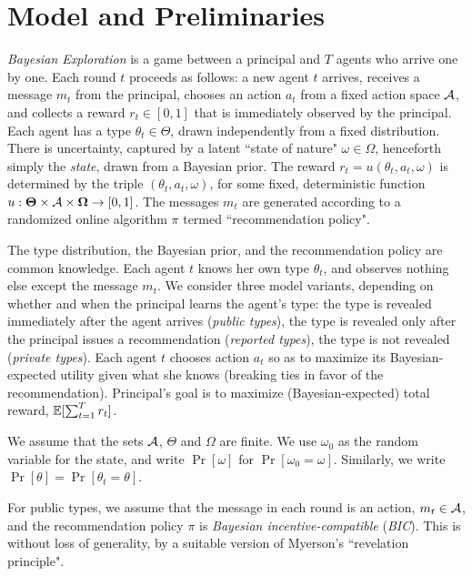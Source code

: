 \section{Model and Preliminaries}
\label{sec:model}

\emph{Bayesian Exploration} is a game between a principal and $T$ agents who arrive one by one. Each round $t$ proceeds as follows: a new agent $t$ arrives, receives a message $m_t$ from the principal, chooses an action $a_t$ from a fixed action space $\mathcal{A}$, and collects a reward $r_t\in [0,1]$ that is immediately observed by the principal. Each agent has a type $\theta_t\in\varTheta$, drawn independently from a fixed distribution. There is uncertainty, captured by a latent ``state of nature" $\omega\in \varOmega$, henceforth simply the \emph{state}, drawn from a Bayesian prior. The reward $r_t = u(\theta_t,a_t,\omega)$ is determined by the triple $(\theta_t,a_t,\omega)$, for some fixed, deterministic function
    $u:\bold{\Theta}\times \mathcal{A} \times \bold{\Omega} \to [0,1]$.
The messages $m_t$ are generated according to a randomized online algorithm $\pi$ termed ``recommendation policy".

The type distribution, the Bayesian prior, and the recommendation policy are common knowledge. Each agent $t$ knows her own type $\theta_t$, and observes nothing else except the message $m_t$.  We consider three model variants, depending on whether and when the principal learns the agent's type: the type is revealed immediately after the agent arrives (\emph{public types}), the type is revealed only after the principal issues a recommendation (\emph{reported types}), the type is not revealed (\emph{private types}). Each agent $t$ chooses action $a_t$ so as to maximize its Bayesian-expected utility given what she knows (breaking ties in favor of the recommendation). Principal's goal is to maximize (Bayesian-expected) total reward, \ie $\mathbb{E}[\sum_{t=1}^T r_t]$.

We assume that the sets $\mathcal{A}$, $\varTheta$ and $\varOmega$ are finite. We use $\omega_0$ as the random variable for the state, and write $\Pr[\omega]$ for $\Pr[\omega_0=\omega]$. Similarly, we write $\Pr[\theta]=\Pr[\theta_t=\theta]$.

For public types, we assume that the message in each round is an action, \ie $m_t \in \mathcal{A}$, and the recommendation policy $\pi$ is {\em Bayesian incentive-compatible} (\emph{BIC}). This is without loss of generality, by a suitable version of Myerson's ``revelation principle".

